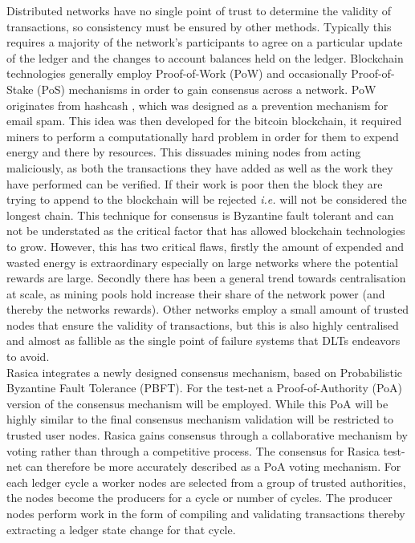 Distributed networks have no single point of trust to determine the validity of transactions, so consistency must be ensured by other methods. Typically this requires a majority of the network's participants to agree on a particular update of the ledger and the changes to account balances held on the ledger. Blockchain technologies generally employ Proof-of-Work (PoW) and occasionally Proof-of-Stake (PoS) mechanisms in order to gain consensus across a network. PoW originates from hashcash \cite{back2002hashcash}, which was designed as a prevention mechanism for email spam. This idea was then developed for the bitcoin blockchain, it required miners to perform a computationally hard problem in order for them to expend energy and there by resources. This dissuades mining nodes from acting maliciously, as both the transactions they have added as well as the work they have performed can be verified. If their work is poor then the block they are trying to append to the blockchain will be rejected \textit{i.e.} will not be considered the longest chain. This technique for consensus is Byzantine fault tolerant and can not be understated as the critical factor that has allowed blockchain technologies to grow. However, this has two critical flaws, firstly the amount of expended and wasted energy is extraordinary especially on large networks where the potential rewards are large. Secondly there has been a general trend towards centralisation at scale, as mining pools hold increase their share of the network power (and thereby the networks rewards). Other networks employ a small amount of trusted nodes that ensure the validity of transactions, but this is also highly centralised and almost as fallible as the single point of failure systems that DLTs endeavors to avoid. \\


Rasica integrates a newly designed consensus mechanism, based on Probabilistic Byzantine Fault Tolerance (PBFT). For the test-net a Proof-of-Authority (PoA) version of the consensus mechanism will be employed. While this PoA will be highly similar to the final consensus mechanism validation will be restricted to trusted user nodes. Rasica gains consensus through a collaborative mechanism by voting rather than through a competitive process. The consensus for Rasica test-net can therefore be more accurately described as a PoA voting mechanism. For each ledger cycle a worker nodes are selected from a group of trusted authorities, the nodes become the producers for a cycle or number of cycles. The producer nodes perform work in the form of compiling and validating transactions thereby extracting a ledger state change for that cycle. \\

